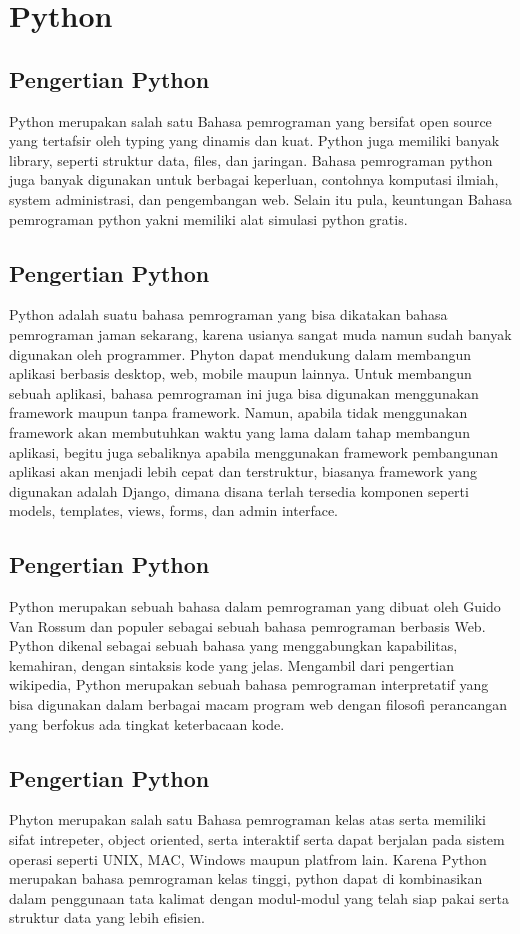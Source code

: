 
\section{Python}
\subsection{Pengertian Python}
Python merupakan salah satu Bahasa pemrograman yang bersifat open source yang tertafsir oleh typing yang dinamis dan kuat. Python juga memiliki banyak library, seperti struktur data, files, dan jaringan. Bahasa pemrograman python juga banyak digunakan untuk berbagai keperluan, contohnya komputasi ilmiah, system administrasi, dan pengembangan web. Selain itu pula, keuntungan Bahasa pemrograman python yakni memiliki alat simulasi python gratis.
\subsection{Pengertian Python}
Python adalah suatu bahasa pemrograman yang bisa dikatakan bahasa pemrograman jaman sekarang, karena usianya sangat muda namun sudah banyak digunakan oleh programmer. Phyton dapat mendukung dalam membangun aplikasi berbasis desktop, web, mobile maupun lainnya. Untuk membangun sebuah aplikasi, bahasa pemrograman ini juga bisa digunakan menggunakan framework maupun tanpa framework. Namun, apabila tidak menggunakan framework akan membutuhkan waktu yang lama dalam tahap membangun aplikasi, begitu juga sebaliknya apabila menggunakan framework pembangunan aplikasi akan menjadi lebih cepat dan terstruktur, biasanya framework yang digunakan adalah Django, dimana disana terlah tersedia komponen seperti models, templates, views, forms, dan admin interface.
\subsection{Pengertian Python}
Python merupakan sebuah bahasa dalam pemrograman yang dibuat oleh Guido Van Rossum dan populer sebagai sebuah bahasa pemrograman berbasis Web. Python dikenal sebagai sebuah bahasa yang menggabungkan kapabilitas, kemahiran, dengan sintaksis kode yang jelas. Mengambil dari pengertian wikipedia, Python merupakan sebuah bahasa pemrograman interpretatif yang bisa digunakan dalam berbagai macam program web dengan filosofi perancangan yang berfokus ada tingkat keterbacaan kode.
\subsection{Pengertian Python}
Phyton merupakan salah satu Bahasa pemrograman kelas atas serta memiliki sifat intrepeter, object oriented, serta interaktif serta dapat berjalan pada sistem operasi seperti UNIX, MAC, Windows maupun platfrom lain. Karena Python merupakan bahasa pemrograman kelas tinggi, python dapat di kombinasikan dalam penggunaan tata kalimat dengan modul-modul yang telah siap pakai serta struktur data yang lebih efisien.
